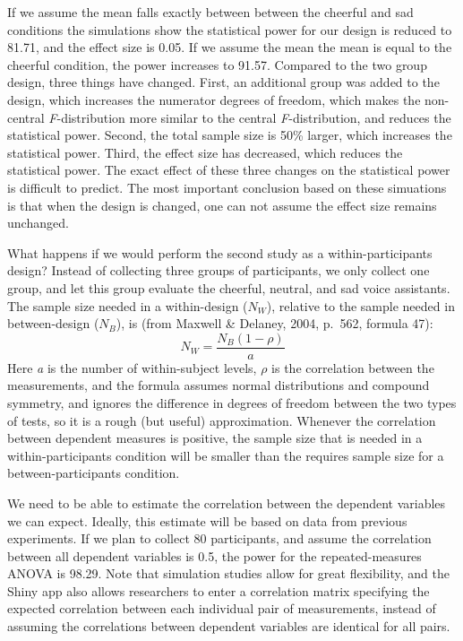 \documentclass[,jou, draftfirst, a4paper,floatsintext]{apa6}
\begin{document}
If we assume the mean falls exactly between between the cheerful and sad conditions the simulations show the statistical power for our design is reduced to 81.71, and the effect size is 0.05.
If we assume the mean the mean is equal to the cheerful condition, the power increases to 91.57.
Compared to the two group design, three things have changed.
First, an additional group was added to the design, which increases the numerator degrees of freedom, which makes the non-central \emph{F}-distribution more similar to the central \emph{F}-distribution, and reduces the statistical power.
Second, the total sample size is 50\% larger, which increases the statistical power.
Third, the effect size has decreased, which reduces the statistical power.
The exact effect of these three changes on the statistical power is difficult to predict.
The most important conclusion based on these simuations is that when the design is changed, one can not assume the effect size remains unchanged.

What happens if we would perform the second study as a within-participants design?
Instead of collecting three groups of participants, we only collect one group, and let this group evaluate the cheerful, neutral, and sad voice assistants.
The sample size needed in a within-design (\(N_W\)), relative to the sample needed in between-design (\(N_B\)), is (from Maxwell \& Delaney, 2004, p.~562, formula 47):
\begin{equation}
N_{W}=\frac{N_{B}(1-\rho)}{a} \label{eq:within-n}
\end{equation}
Here \emph{a} is the number of within-subject levels, \(\rho\) is the correlation between the measurements, and the formula assumes normal distributions and compound symmetry, and ignores the difference in degrees of freedom between the two types of tests, so it is a rough (but useful) approximation.
Whenever the correlation between dependent measures is positive, the sample size that is needed in a within-participants condition will be smaller than the requires sample size for a between-participants condition.

We need to be able to estimate the correlation between the dependent variables we can expect.
Ideally, this estimate will be based on data from previous experiments.
If we plan to collect 80 participants, and assume the correlation between all dependent variables is 0.5, the power for the repeated-measures ANOVA is 98.29.
Note that simulation studies allow for great flexibility, and the Shiny app also allows researchers to enter a correlation matrix specifying the expected correlation between each individual pair of measurements, instead of assuming the correlations between dependent variables are identical for all pairs.
\end{document}
